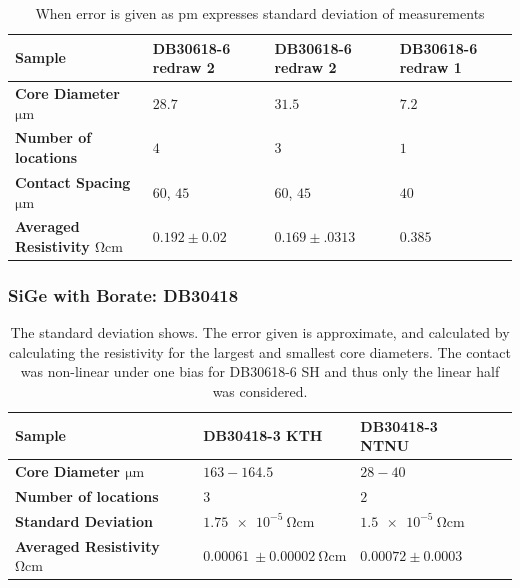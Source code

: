 \begin{table}[!h]
\begin{center}
\begin{tabular}{ | l | l | l | l |}
\hline
\textbf{Sample}& DB30618-6 redraw 2 & DB30618-6 redraw  2 & DB30618-6 redraw  1\\ \hline
\textbf{Core Diameter $\si{\micro \meter}$}& $28.7$ &$31.5$&$7.2$\\\hline
\textbf{Number of locations}&$4$&$ 3$&$1$ \\\hline
\textbf{Contact Spacing $\si{\micro \meter}$}&$60$, $45$& $60$, $45$ &$40$\\\hline
\textbf{Averaged Resistivity $\si{\ohm \cm}$}& $0.192 \pm 0.02$ &$ 0.169 \pm .0313 $&$0.385$ \\\hline
\end{tabular}
\end{center}
\caption{When error is given as pm expresses standard deviation of measurements}
\label{Tabmb25}
\end{table}

\FloatBarrier
\subsubsection{SiGe with Borate: DB30418}
\begin{table}[!h]
\begin{center}
\begin{tabular}{ | l | l | l | l |}
\hline
\textbf{Sample}& DB30418-3 KTH & DB30418-3 NTNU \\ \hline
\textbf{Core Diameter $\si{\micro \meter}$}& $ 163-164.5$ & $28-40$ \\\hline
\textbf{Number of locations}&$3$&$2$ \\\hline
\textbf{Standard Deviation}& $\SI{1.75e-5}{\ohm \cm}$ & $ \SI{1.5e-5}{\ohm\cm}$ \\\hline
\textbf{Averaged Resistivity $\si{\ohm \cm}$}& $\SI{0.00061}{}\pm\SI{ 0.00002}{\ohm \cm}$ &$0.00072 \pm 0.0003 $ \\\hline
\end{tabular}
\end{center}
\caption{The standard deviation shows. The error given is approximate, and calculated by calculating the resistivity for the largest and smallest core diameters. The contact was non-linear under one bias for DB30618-6 SH and thus only the linear half was considered. }
\label{Tabmb25}
\end{table}

